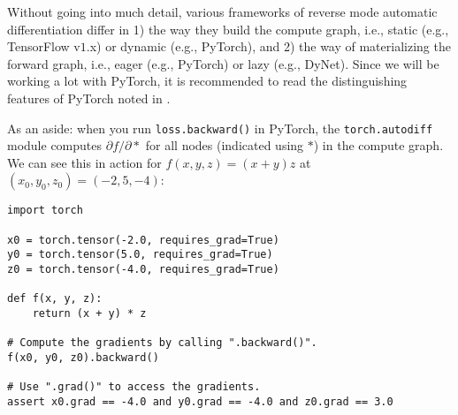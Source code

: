 Without going into much detail, various frameworks of reverse mode automatic differentiation differ in 1) the way they build the compute graph, i.e., static (e.g., TensorFlow v$1.$x) or dynamic (e.g., PyTorch), and 2) the way of materializing the forward graph, i.e., eager (e.g., PyTorch) or lazy (e.g., DyNet). Since we will be working a lot with PyTorch, it is recommended to read the distinguishing features of PyTorch noted in \cite{paszke2017automatic}.

As an aside: when you run \texttt{loss.backward()} in PyTorch, the \texttt{torch.autodiff} module computes $\partial f / \partial \ast$ for all nodes (indicated using $\ast$) in the compute graph. We can see this in action for $f(x, y, z) = (x + y) z$ at $(x_0, y_0, z_0) = (-2, 5, -4)$:

\begin{lstlisting}
import torch

x0 = torch.tensor(-2.0, requires_grad=True)
y0 = torch.tensor(5.0, requires_grad=True)
z0 = torch.tensor(-4.0, requires_grad=True)

def f(x, y, z):
    return (x + y) * z

# Compute the gradients by calling ".backward()".
f(x0, y0, z0).backward()

# Use ".grad()" to access the gradients.
assert x0.grad == -4.0 and y0.grad == -4.0 and z0.grad == 3.0
\end{lstlisting}

